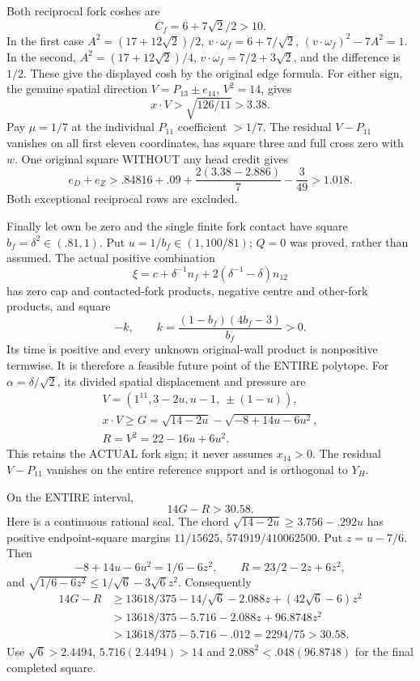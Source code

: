\documentclass[11pt]{article}
\begin{document}
Both reciprocal fork coshes are
\[
                         C_f=6+7\sqrt2/2>10 .
\]
In the first case
\(A^2=(17+12\sqrt2)/2\),
\(v\cdot\omega_f=6+7/\sqrt2\),
\((v\cdot\omega_f)^2-7A^2=1\).
In the second,
\(A^2=(17+12\sqrt2)/4\),
\(v\cdot\omega_f=7/2+3\sqrt2\),
and the difference is \(1/2\).
These give the displayed cosh by the original
edge formula.
For either sign, the genuine spatial direction
\(V=P_{13}\pm e_{14}\), \(V^2=14\), gives
\[
                 x\cdot V>\sqrt{126/11}>3.38 .
\]
Pay \(\mu=1/7\) at the individual \(P_{11}\)
coefficient \(>1/7\).
The residual \(V-P_{11}\) vanishes on all first
eleven coordinates, has square three and full
cross zero with \(w\).
One original square WITHOUT any head credit gives
\[
          e_D+e_Z>.84816+.09+
                      {\frac{2(3.38-2.886)}{7}}-{\frac{3}{49}}>1.018.
\]
Both exceptional reciprocal rows are excluded.

Finally let own be zero and the single finite fork
contact have square \(b_f=\delta^2\in(.81,1)\).
Put \(u=1/b_f\in(1,100/81)\); \(Q=0\) was proved,
rather than assumed.
The actual positive combination
\[
               \xi=c+\delta^{-1}n_f
                           +2(\delta^{-1}-\delta)n_{12}
\]
has zero cap and contacted-fork products, negative
centre and other-fork products, and square
\[
                   -k,\qquad k={\frac{(1-b_f)(4b_f-3)}{b_f}}>0 .
\]
Its time is positive and every unknown original-wall
product is nonpositive termwise.
It is therefore a feasible future point of the
ENTIRE polytope.
For \(\alpha=\delta/\sqrt2\), its divided spatial
displacement and pressure are
\[
 \begin{gathered}
 V=(1^{11},3-2u,u-1,\ \pm(1-u)),\\
 x\cdot V\ge G=\sqrt{14-2u}-\sqrt{-8+14u-6u^2},\\
 R=V^2=22-16u+6u^2 .
 \end{gathered}
\]
This retains the ACTUAL fork sign; it never assumes
\(x_{14}>0\).
The residual \(V-P_{11}\) vanishes on the entire
reference support and is orthogonal to \(Y_H\).

On the ENTIRE interval,
\[
                             14G-R>30.58 .
\]
Here is a continuous rational seal.
The chord
\(\sqrt{14-2u}\ge3.756-.292u\)
has positive endpoint-square margins
\(11/15625\), \(574919/410062500\).
Put \(z=u-7/6\).
Then
\[
 -8+14u-6u^2=1/6-6z^2,\qquad
 R=23/2-2z+6z^2,
\]
and
\(\sqrt{1/6-6z^2}\le1/\sqrt6-3\sqrt6z^2\).
Consequently
\[
 \begin{split}
 14G-R
 &\ge13618/375-14/\sqrt6-2.088z+(42\sqrt6-6)z^2\\
 &>13618/375-5.716-2.088z+96.8748z^2\\
 &>13618/375-5.716-.012=2294/75>30.58 .
 \end{split}
\]
Use \(\sqrt6>2.4494\), \(5.716(2.4494)>14\)
and \(2.088^2<.048(96.8748)\) for the final
completed square.
\end{document}
